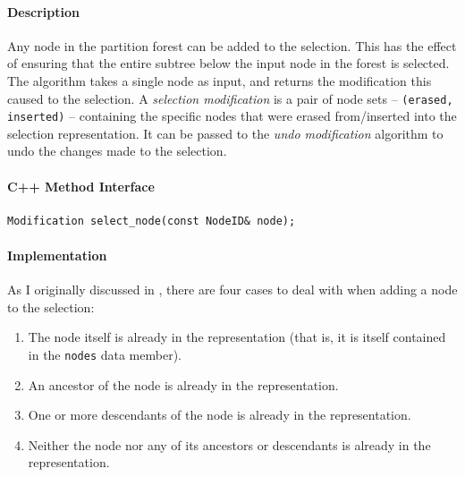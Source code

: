 \paragraph{Description}

Any node in the partition forest can be added to the selection. This has the effect of ensuring that the entire subtree below the input node in the forest is selected. The algorithm takes a single node as input, and returns the modification this caused to the selection. A \emph{selection modification} is a pair of node sets -- \texttt{(erased, inserted)} -- containing the specific nodes that were erased from/inserted into the selection representation. It can be passed to the \emph{undo modification} algorithm to undo the changes made to the selection.

\paragraph{C++ Method Interface}

\begin{lstlisting}[style=Prototype]
Modification select_node(const NodeID& node);
\end{lstlisting}

\paragraph{Implementation}

As I originally discussed in \cite{gvcispa09}, there are four cases to deal with when adding a node to the selection:

\begin{enumerate}

\item The node itself is already in the representation (that is, it is itself contained in the \texttt{nodes} data member).
\item An ancestor of the node is already in the representation.
\item One or more descendants of the node is already in the representation.
\item Neither the node nor any of its ancestors or descendants is already in the representation.

\end{enumerate}

